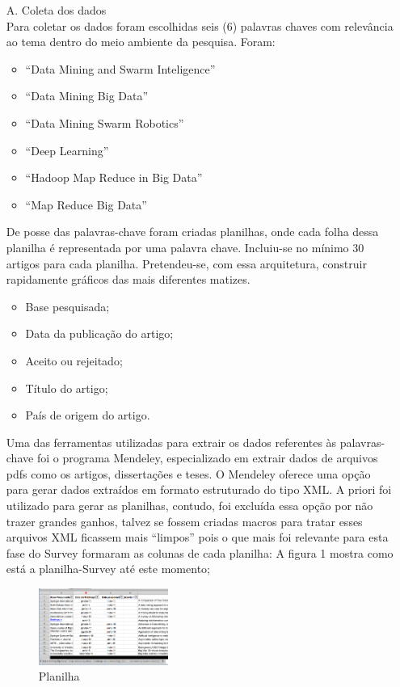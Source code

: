 \documentclass[conference,compsoc]{IEEEtran}
\begin{document}
\begin{enumerate}
 \item[A.] Coleta dos dados\\
 Para coletar os dados foram escolhidas seis (6) palavras chaves com relevância ao tema dentro do meio ambiente da pesquisa. Foram:
  \begin{itemize}
    \item “Data Mining and Swarm Inteligence”
    \item “Data Mining Big Data”
    \item “Data Mining Swarm Robotics”
    \item “Deep Learning”
    \item “Hadoop Map Reduce in Big Data”
    \item “Map Reduce Big Data”
  \end{itemize}


 De posse das palavras-chave foram criadas planilhas, onde cada folha dessa planilha é representada por uma palavra chave. 
 Incluiu-se no mínimo 30 artigos para cada planilha. 
 Pretendeu-se, com essa arquitetura, construir rapidamente gráficos das mais diferentes matizes.
  \begin{itemize}
    \item Base pesquisada;
    \item Data da publicação do artigo;
    \item Aceito ou rejeitado;
    \item Título do artigo;
    \item País de origem do artigo.
  \end{itemize}

  Uma das ferramentas utilizadas para extrair os dados referentes às palavras-chave foi o programa Mendeley, especializado
  em extrair dados de arquivos pdfs como os artigos, dissertações e teses. O Mendeley oferece uma opção para gerar dados 
  extraídos em formato estruturado do tipo XML. A priori foi utilizado para gerar as planilhas, contudo, foi excluída essa
  opção por não trazer grandes ganhos, talvez se fossem criadas macros para tratar esses arquivos XML ficassem mais ``limpos''
  pois o que mais foi relevante para esta fase do Survey formaram as colunas de cada planilha:
  A figura 1 mostra como está a planilha-Survey até este momento;
  
 
  \begin{figure}[!ht]
  \centering %
  \caption{Planilha}
  \flushright
  \includegraphics[width=0.4\textwidth]{Figuras/PlanilhaSrvey.png}
  \end{figure}
  

\end{enumerate}
\end{document}
